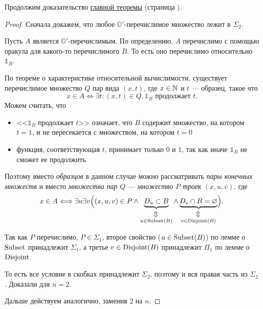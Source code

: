 \noindent
Продолжим доказательство \hyperref[thm:main_thm]{главной теоремы} (страница \pageref{thm:main_thm}).
\begin{proof}\label{proof:main_thm}
	Сначала докажем, что любое $ \mathbb{O}'$-перечислимое множество лежит в  $ \Sigma_2$.

	Пусть  $ A$ является $ \mathbb{O}'$-перечислимым. По определению, $ A$ перечислимо с помощью оракула для какого-то перечислимого $ B$. То есть оно перечислимо относительно  $ \mathbb{1}_B$.

	По теореме о характеристике относительной вычислимости, существует перечислимое множество $ Q$ пар вида $ (x, t)$,  где $ x \in \mathbb{N}$ и $ t$ --- образец, такое что 
	\[
		x \in A \Longleftrightarrow \exists t \colon (x, t) \in Q, \mathbb{1}_B \text{ продолжает } t
	.\] 
	Можем считать, что
	\begin{itemize}
		\item  <<$ \mathbb{1}_B$ продолжает $ t$>> означает, что $ B$ содержит множество, на котором  $ t = 1$, и не пересекается с множеством, на котором  $ t = 0$
		\item функция, соответствующая $ t$, принимает только $ 0$ и $ 1$, так как иначе $ \mathbb{1}_B$ не сможет ее продолжить
	\end{itemize}
	Поэтому вместо \textit{образцов} в данном случае можно рассматривать \textit{пары конечных множеств} и вместо \textit{множества пар $ Q$} --- \textit{множество $ P$ троек} $ (x, u, v)$, где 
	\[
		x \in A \Longleftrightarrow \exists u \exists v \Bigl( (x, u,v) \in P \wedge
			\underbrace{D_u \subset B}_{\stackrel{\rotatebox[origin=c]{90}{$\Leftrightarrow$}}{u \in \Subsetm(B)}} \wedge 
		\underbrace{D_v \cap B = \varnothing}_{\stackrel{\rotatebox[origin=c]{90}{$\Leftrightarrow$}}{v \in  \Disjointm(B)}} \Bigr) 
	.\] 

	Так как $ P$ перечислимо,  $ P \in \Sigma_1$, второе свойство ($u \in  \operatorname{Subset}(B)$) по лемме о $ \operatorname{Subset}$ принадлежит  $ \Sigma_1$, а третье  $ v \in \operatorname{Disjoint}(B)$ принадлежит $ \Pi_1$ по лемме о \ $ \operatorname{Disjoint}$.

	То есть все условие в скобках принадлежит  $ \Sigma_2$, поэтому и вся правая часть из  $ \Sigma_2$.  Доказали для  $ n = 2$.
	
	Дальше действуем аналогично, заменив  $ 2$ на  $ n$.
\end{proof}

